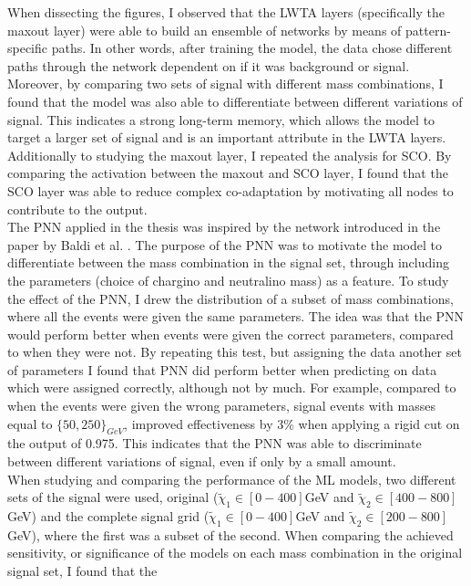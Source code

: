 When dissecting the figures, I observed that the \ac{LWTA} layers (specifically the maxout layer) were able to build an ensemble of networks by means of pattern-specific paths. In other words, after training 
the model, the data chose different paths through the network dependent on if it was background or signal. Moreover, by comparing two sets of signal with different mass combinations, I found that the model 
was also able to differentiate between different variations of signal. This indicates a strong long-term memory, which allows the model to target a larger set of signal and is an important attribute
in the \ac{LWTA} layers. Additionally to studying the maxout layer, I repeated the analysis for \ac{SCO}. By comparing the activation between the maxout and \ac{SCO} layer, I found that the \ac{SCO} layer 
was able to reduce complex co-adaptation by motivating all nodes to contribute to the output.
\\\newline
The \ac{PNN} applied in the thesis was inspired by the network introduced in the paper by Baldi et al. \cite{PNN}. The purpose of the \ac{PNN} was to motivate the model to differentiate between the mass combination 
in the signal set, through including the parameters (choice of chargino and neutralino mass) as a feature. To study the effect of the \ac{PNN}, I drew the distribution of a subset of mass combinations, where all the events were given the same parameters.
The idea was that the \ac{PNN} would perform better when events were given the correct parameters, compared to when they were not. By repeating this test, but assigning the data another set of parameters I found that \ac{PNN} did 
perform better when predicting on data which were assigned correctly, although not by much. For example, compared to when the events were given the wrong parameters, signal events with masses equal to $\{50,250\}_{GeV}$, 
improved effectiveness by $3\%$ when applying a rigid cut on the output of 0.975. This indicates that the \ac{PNN} was able to discriminate between different variations of signal, even if only by 
a small amount.
\\\newline
When studying and comparing the performance of the \ac{ML} models, two different sets of the signal were used, original ($\tilde{\chi}_1\in[0-400]$GeV and  $\tilde{\chi}_2\in[400-800]$GeV) and the complete signal grid ($\tilde{\chi}_1\in[0-400]$GeV 
and $\tilde{\chi}_2\in[200-800]$GeV), where the first was a subset of the second. When comparing the achieved sensitivity, or significance of the models on each mass combination in the original signal set, I found that the 

